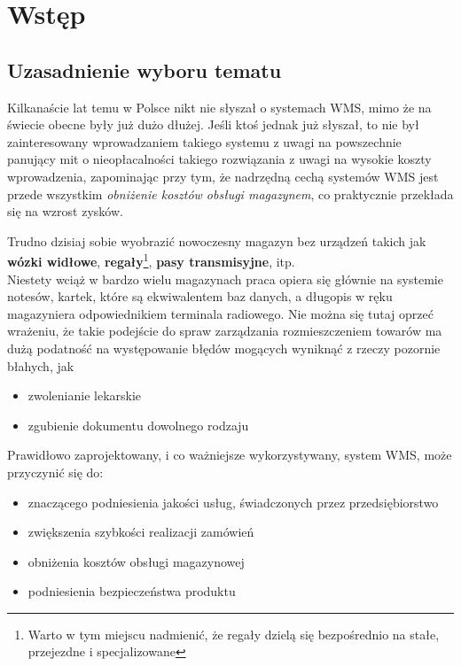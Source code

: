 \chapter{Wstęp}
\label{c1:c1}

\section{Uzasadnienie wyboru tematu}
	\hspace{10pt}Kilkanaście lat temu w Polsce nikt nie słyszał o systemach WMS, mimo że na świecie
	obecne były już dużo dłużej. Jeśli ktoś jednak już słyszał, to nie był zainteresowany
	wprowadzaniem takiego systemu z uwagi na powszechnie panujący mit o nieopłacalności takiego
	rozwiązania z uwagi na wysokie koszty wprowadzenia, zapominając przy tym, że nadrzędną cechą systemów WMS jest
	przede wszystkim \emph{obniżenie kosztów obsługi magazynem}, co praktycznie przekłada się na wzrost 
	zysków.
	
	Trudno dzisiaj sobie wyobrazić nowoczesny magazyn bez urządzeń takich jak \textbf{wózki widłowe}, 
	\textbf{regały}\footnote{Warto w tym miejscu nadmienić, że regały dzielą się bezpośrednio na stałe,
	przejezdne i specjalizowane}, \textbf{pasy transmisyjne}, itp. \\ 
	Niestety wciąż w bardzo wielu magazynach praca opiera się głównie na systemie notesów, kartek, które 
	są ekwiwalentem baz danych, a długopis w ręku magazyniera odpowiednikiem terminala radiowego. Nie 
	można się tutaj oprzeć wrażeniu, że takie podejście do spraw zarządzania rozmieszczeniem towarów
	ma dużą podatność na występowanie błędów mogących wyniknąć z rzeczy pozornie błahych, jak
	\begin{itemize}
		\item zwolenianie lekarskie
		\item zgubienie dokumentu dowolnego rodzaju
	\end{itemize}
	
	Prawidłowo zaprojektowany, i co ważniejsze wykorzystywany, system WMS, może przyczynić się do:
	\begin{itemize}
		\item znaczącego podniesienia jakości usług, świadczonych przez przedsiębiorstwo
		\item zwiększenia szybkości realizacji zamówień
		\item obniżenia kosztów obsługi magazynowej
		\item podniesienia bezpieczeństwa produktu
	\end{itemize}

